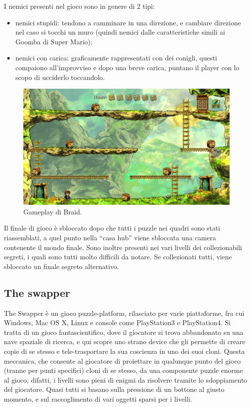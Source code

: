 I nemici presenti nel gioco sono in genere di 2 tipi:

\begin{itemize}
\item nemici stupidi: tendono a camminare in una direzione, e cambiare direzione nel caso si tocchi un muro (quindi nemici dalle caratteristiche simili ai Goomba di Super Mario);
\item nemici con carica: graficamente rappresentati con dei conigli, questi compaiono all'improvviso e dopo una breve carica, puntano il player con lo scopo di ucciderlo toccandolo.
\end{itemize}

\begin{figure}[h]
\centerline{\includegraphics[scale=0.5]{images/statoarte/bgameplay.png}}
\caption{Gameplay di Braid.}
\label{fig:bgameplay}
\end{figure}

Il finale di gioco è sbloccato dopo che tutti i puzzle nei quadri sono stati riassemblati, a quel punto nella ``casa hub'' viene sbloccata una camera contenente il mondo finale.
Sono inoltre presenti nei vari livelli dei collezionabili segreti, i quali sono tutti molto difficili da notare. Se collezionati tutti, viene sbloccato un finale segreto alternativo.



\subsection{The swapper}
\label{sec:stato_arte_swapper}

The Swapper è un gioco puzzle-platform, rilasciato per varie piattaforme, fra cui Windows, Mac OS X, Linux e console come PlayStation3 e PlayStation4. Si tratta di un gioco fantascientifico, dove il giocatore si trova abbandonato su una nave spaziale di ricerca, e qui scopre uno strano device che gli permette di creare copie di se stesso e tele-trasportare la sua coscienza in uno dei suoi cloni. Questa meccanica, che consente al giocatore di proiettare in qualunque punto del gioco (tranne per punti specifici) cloni di se stesso, da una componente puzzle enorme al gioco, difatti, i livelli sono pieni di enigmi da risolvere tramite lo sdoppiamento del giocatore. Quasi tutti si basano sulla pressione di un bottone al giusto momento, e sul raccoglimento di vari oggetti sparsi per i livelli.


